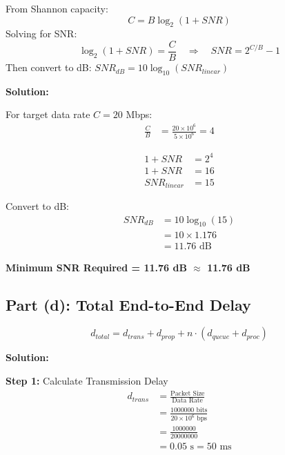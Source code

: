 \documentclass[12pt,a4paper]{article}
\begin{document}
\begin{formulabox}
From Shannon capacity:
\[C = B \log_2(1 + SNR)\]
Solving for SNR:
\[\log_2(1 + SNR) = \frac{C}{B} \quad \Rightarrow \quad SNR = 2^{C/B} - 1\]
Then convert to dB: $SNR_{dB} = 10 \log_{10}(SNR_{linear})$
\end{formulabox}

\textbf{Solution:}

For target data rate $C = 20$ Mbps:
\begin{align*}
\frac{C}{B} &= \frac{20 \times 10^6}{5 \times 10^6} = 4
\end{align*}

\begin{align*}
1 + SNR &= 2^4 \\[1em]
1 + SNR &= 16 \\[1em]
SNR_{linear} &= 15
\end{align*}

Convert to dB:
\begin{align*}
SNR_{dB} &= 10 \log_{10}(15) \\[1em]
&= 10 \times 1.176 \\[1em]
&= 11.76 \text{ dB}
\end{align*}

\begin{answerbox}
\textbf{Minimum SNR Required = 11.76 dB $\approx$ 11.76 dB}
\end{answerbox}

\subsection{Part (d): Total End-to-End Delay}

\begin{formulabox}
\[d_{total} = d_{trans} + d_{prop} + n \cdot (d_{queue} + d_{proc})\]
\end{formulabox}

\textbf{Solution:}

\textbf{Step 1:} Calculate Transmission Delay
\begin{align*}
d_{trans} &= \frac{\text{Packet Size}}{\text{Data Rate}} \\[1em]
&= \frac{1000000 \text{ bits}}{20 \times 10^6 \text{ bps}} \\[1em]
&= \frac{1000000}{20000000} \\[1em]
&= 0.05 \text{ s} = 50 \text{ ms}
\end{align*}
\end{document}
